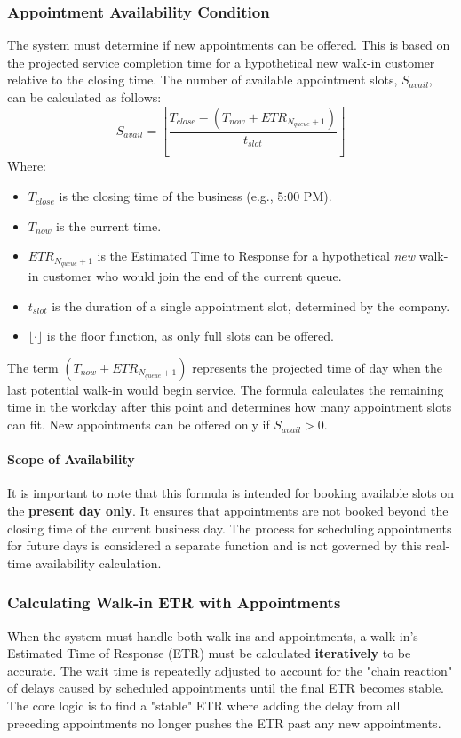 \documentclass[12pt,a4paper]{report}
\begin{document}
\subsubsection{Appointment Availability Condition}
The system must determine if new appointments can be offered. This is based on the projected service completion time for a hypothetical new walk-in customer relative to the closing time. The number of available appointment slots, $S_{avail}$, can be calculated as follows:
\begin{equation}
    S_{avail} = \left\lfloor \frac{T_{close} - (T_{now} + ETR_{N_{queue}+1})}{t_{slot}} \right\rfloor
\end{equation}
Where:
\begin{itemize}
    \item $T_{close}$ is the closing time of the business (e.g., 5:00 PM).
    \item $T_{now}$ is the current time.
    \item $ETR_{N_{queue}+1}$ is the Estimated Time to Response for a hypothetical \textit{new} walk-in customer who would join the end of the current queue.
    \item $t_{slot}$ is the duration of a single appointment slot, determined by the company.
    \item $\lfloor \cdot \rfloor$ is the floor function, as only full slots can be offered.
\end{itemize}
The term $(T_{now} + ETR_{N_{queue}+1})$ represents the projected time of day when the last potential walk-in would begin service. The formula calculates the remaining time in the workday after this point and determines how many appointment slots can fit. New appointments can be offered only if $S_{avail} > 0$.

\paragraph{Scope of Availability} It is important to note that this formula is intended for booking available slots on the \textbf{present day only}. It ensures that appointments are not booked beyond the closing time of the current business day. The process for scheduling appointments for future days is considered a separate function and is not governed by this real-time availability calculation.

\subsubsection{Calculating Walk-in ETR with Appointments}
When the system must handle both walk-ins and appointments, a walk-in's Estimated Time of Response (ETR) must be calculated \textbf{iteratively} to be accurate. The wait time is repeatedly adjusted to account for the "chain reaction" of delays caused by scheduled appointments until the final ETR becomes stable. The core logic is to find a "stable" ETR where adding the delay from all preceding appointments no longer pushes the ETR past any new appointments.
\end{document}
